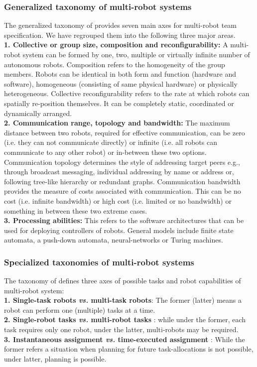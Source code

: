 \subsubsection*{Generalized taxonomy of multi-robot systems}
The generalized taxonomy of  provides seven main axes for multi-robot team specification. We have regrouped them into the following three major areas.\\
\textbf{1. Collective or group size, composition and reconfigurability: }  A multi-robot system can be formed by one, two, multiple or virtually infinite number of autonomous robots. Composition refers to the homogeneity of the group members. Robots can be identical in both form and function (hardware and software), homogeneous (consisting of same physical hardware) or physically heterogeneous. Collective reconfigurability refers to the rate at which robots can spatially re-position themselves. It can be completely static, coordinated or dynamically arranged.\\
\textbf{2. Communication range, topology and bandwidth: } The maximum distance between two robots, required for effective communication, can be zero (i.e. they can not communicate directly) or infinite (i.e. all robots can communicate to any other robot) or in-between these two options. Communication topology determines the style of addressing target peers e.g., through broadcast messaging, individual addressing by name or address or, following tree-like hierarchy or redundant graphs. Communication bandwidth provides the measure of costs associated with communication. This can be no cost (i.e. infinite bandwidth) or high cost (i.e. limited or no bandwidth) or something in between these two extreme cases.\\
\textbf{3. Processing abilities: } This refers to the software architectures that can be used for deploying controllers of robots. General models include finite state automata, a push-down automata, neural-networks or Turing machines. 
\subsubsection*{Specialized taxonomies of multi-robot systems} 
The taxonomy of  defines three axes of possible tasks and robot capabilities of multi-robot system:\\
\textbf{1. Single-task robots  {\em vs.} multi-task robots}: The former (latter) means a robot can perform one (multiple) tasks at a time.\\
\textbf{2. Single-robot tasks  {\em vs.} multi-robot tasks }: while under the former, each task requires only one robot, under the latter, multi-robots may be required.\\
\textbf{3. Instantaneous assignment {\em vs.} time-executed assignment }: While the former refers a situation when planning for future task-allocations is not possible, under latter, planning is possible.

